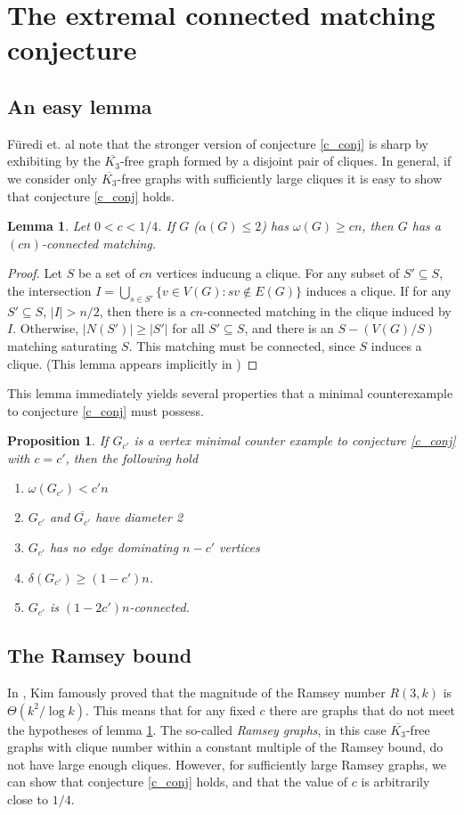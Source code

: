 \documentclass[12pt]{article}
\newtheorem{prop}{Proposition}
\newtheorem{lem}{Lemma}
\theoremstyle{definition}
\begin{document}
\section{The extremal connected matching conjecture}
\subsection{An easy lemma}
F\"{u}redi et. al note that the stronger version of conjecture \ref{c_conj} is sharp by exhibiting by the $\overline{K_3}$-free graph formed by a disjoint pair of cliques.  In general, if we consider only $\overline{K_3}$-free graphs with sufficiently large cliques it is easy to show that conjecture \ref{c_conj} holds.
\begin{lem}Let $0<c<1/4$.  If $G$ ($\alpha(G) \leq 2$) has $\omega(G) \geq cn$, then $G$ has a $(cn)$-connected matching.
\label{spider}
\end{lem}
\begin{proof}
	Let $S$ be a set of $cn$ vertices inducung a clique.  For any subset of $S'\subseteq S$, the intersection $\displaystyle I = \bigcup_{s\in S'} \{v \in V(G): sv \notin E(G)\}$ induces a clique.  If for any $S'\subseteq S$, $|I| > n/2$, then there is a $cn$-connected matching in the clique induced by $I$.  Otherwise, $|N(S')| \geq |S'|$ for all $S'\subseteq S$, and there is an $S-(V(G)/S)$ matching saturating $S$.  This matching must be connected, since $S$ induces a clique. (This lemma appears implicitly in \cite{FGS})
\end{proof}
This lemma immediately yields several properties that a minimal counterexample to conjecture \ref{c_conj} must possess.
\begin{prop}
 If $G_{c'}$ is a vertex minimal counter example to conjecture \ref{c_conj} with $c = c'$, then the following hold 
\begin{enumerate}
	\item $\omega(G_{c'}) < c'n$
	\item $G_{c'}$ and $\overline{G_{c'}}$ have diameter 2
	\item $G_{c'}$ has no edge dominating $n-c'$ vertices
	\item $\delta(G_{c'}) \geq (1-c')n$.
	\item $G_{c'}$ is $(1-2c')n$-connected.
\end{enumerate}
\end{prop}

\subsection{The Ramsey bound}
In \cite{MR1369063}, Kim famously proved that the magnitude of the Ramsey number $R(3,k)$ is $\Theta(k^2/\log k)$.  This means that for any fixed $c$ there are graphs that do not meet the hypotheses of lemma \ref{spider}.  The so-called \textit{Ramsey graphs}, in this case $\overline{K_3}$-free graphs with clique number within a constant multiple of the Ramsey bound, do not have large enough cliques.  However, for sufficiently large Ramsey graphs, we can show that conjecture \ref{c_conj} holds, and that the value of $c$ is arbitrarily close to $1/4$. 
\end{document}
